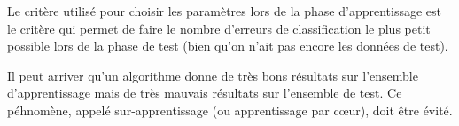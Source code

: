 Le critère utilisé pour choisir les paramètres lors de la phase d'apprentissage est le critère qui permet de faire le nombre d'erreurs de classification
le plus petit possible lors de la phase de test (bien qu'on n'ait pas encore les données de test).

Il peut arriver qu'un algorithme donne de très bons résultats sur l'ensemble d'apprentissage mais de très mauvais résultats sur l'ensemble de test.
Ce péhnomène, appelé sur-apprentissage (ou apprentissage par cœur), doit être évité.
